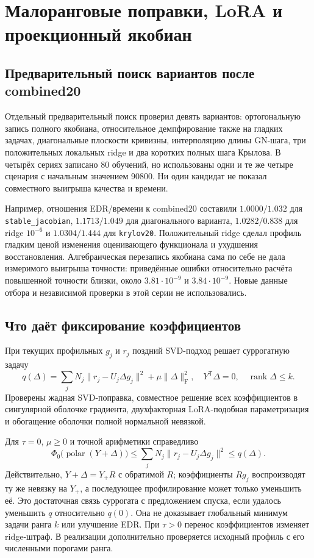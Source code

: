 \documentclass[11pt,a4paper]{article}
\numberwithin{equation}{section}
\newcommand{\T}{^{\mathsf T}}
\newcommand{\F}{_{\mathrm F}}
\newcommand{\file}[1]{\nolinkurl{#1}}
\DeclareMathOperator{\rank}{rank}
\DeclareMathOperator{\polar}{polar}
\begin{document}
\section{Малоранговые поправки, LoRA и проекционный якобиан}
\label{sec:lowrank}

\subsection{Предварительный поиск вариантов после combined20}

Отдельный предварительный поиск проверил девять вариантов:
ортогональную запись полного якобиана, относительное демпфирование
также на гладких задачах, диагональные плоскости кривизны,
интерполяцию длины GN-шага, три положительных локальных ridge
и два коротких полных шага Крылова.
В четырёх сериях записано 80 обучений, но использованы одни и те же
четыре сценария с начальным значением 90800.
Ни один кандидат не показал совместного выигрыша качества и времени.

Например, отношения EDR/времени к combined20 составили
$1.0000/1.032$ для \file{stable_jacobian}, $1.1713/1.049$
для диагонального варианта, $1.0282/0.838$ для ridge $10^{-6}$
и $1.0304/1.444$ для \file{krylov20}.
Положительный ridge сделал профиль гладким ценой изменения
оценивающего функционала и ухудшения восстановления.
Алгебраическая перезапись якобиана сама по себе не дала измеримого
выигрыша точности: приведённые ошибки относительно расчёта повышенной
точности близки, около $3.81\cdot10^{-9}$ и $3.84\cdot10^{-9}$.
Новые данные отбора и независимой проверки в этой серии не использовались.
\cite{screen22}

\subsection{Что даёт фиксирование коэффициентов}

При текущих профильных $g_j$ и $r_j$ поздний SVD-подход решает
суррогатную задачу
\begin{equation}\label{eq:lowrank}
 q(\Delta)=\sum_jN_j\|r_j-U_j\Delta g_j\|^2+\mu\|\Delta\|\F^2,
 \quad Y\T\Delta=0,\quad\rank\Delta\le k.
\end{equation}
Проверены жадная SVD-поправка, совместное решение всех коэффициентов
в сингулярной оболочке градиента, двухфакторная LoRA-подобная
параметризация и обогащение оболочки полной нормальной невязкой.

Для $\tau=0$, $\mu\ge0$ и точной арифметики справедливо
\begin{equation}\label{eq:surrogate}
 \Phi_0\bigl(\polar(Y+\Delta)\bigr)
 \le\sum_jN_j\|r_j-U_j\Delta g_j\|^2\le q(\Delta).
\end{equation}
Действительно, $Y+\Delta=Y_+R$ с обратимой $R$;
коэффициенты $Rg_j$ воспроизводят ту же невязку на $Y_+$,
а последующее профилирование может только уменьшить её.
Это достаточная связь суррогата с предложением спуска, если удалось
уменьшить $q$ относительно $q(0)$. Она не доказывает глобальный
минимум задачи ранга $k$ или улучшение EDR. При $\tau>0$
перенос коэффициентов изменяет ridge-штраф.
В реализации дополнительно проверяется исходный профиль с его
численными порогами ранга.\cite{lowrankmath}
\end{document}
